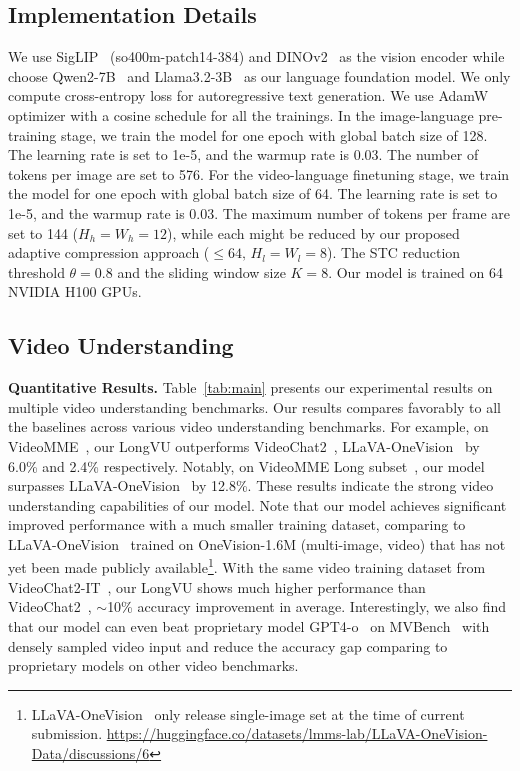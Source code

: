 \subsection{Implementation Details}

We use SigLIP~\citep{zhai2023sigmoid} (so400m-patch14-384) and DINOv2~\citep{oquab2023dinov2} as the vision encoder while choose Qwen2-7B~\citep{qwen2} and Llama3.2-3B~\citep{llama32} as our language foundation model. We only compute cross-entropy loss for autoregressive text generation. We use AdamW~\citep{loshchilov2017decoupled} optimizer with a cosine schedule for all the trainings. In the image-language pre-training stage, we train the model for one epoch with global batch size of 128. The learning rate is set to 1e-5, and the warmup rate is 0.03. The number of tokens per image are set to 576. For the video-language finetuning stage, we train the model for one epoch with global batch size of 64. The learning rate is set to 1e-5, and the warmup rate is 0.03. The maximum number of tokens per frame are set to 144 ($H_h=W_h=12$), while each might be reduced by our proposed adaptive compression approach ($\leq 64, \, H_l=W_l=8$). The STC reduction threshold $\theta=0.8$ and the sliding window size $K = 8$. Our model is trained on 64 NVIDIA H100 GPUs.

\subsection{Video Understanding}

\noindent\textbf{Quantitative Results.} Table~\ref{tab:main} presents our experimental results on multiple video understanding benchmarks. Our results compares favorably to all the baselines across various video understanding benchmarks. For example, on VideoMME~\citep{fu2024video}, our LongVU outperforms VideoChat2~\citep{li2024mvbench}, LLaVA-OneVision~\citep{li2024llava} by 6.0\% and 2.4\% respectively. Notably, on VideoMME Long subset~\citep{fu2024video}, our model surpasses LLaVA-OneVision~\citep{li2024llava} by 12.8\%. These results indicate the strong video understanding capabilities of our model. Note that our model achieves significant improved performance with a much smaller training dataset, comparing to LLaVA-OneVision~\citep{li2024llava} trained on OneVision-1.6M (multi-image, video) that has not yet been made publicly available\footnote{LLaVA-OneVision~\citep{li2024llava} only release single-image set at the time of current submission. \href{https://huggingface.co/datasets/lmms-lab/LLaVA-OneVision-Data/discussions/6}{https://huggingface.co/datasets/lmms-lab/LLaVA-OneVision-Data/discussions/6}}. With the same video training dataset from VideoChat2-IT~\citep{li2024mvbench}, our LongVU shows much higher performance than VideoChat2~\citep{li2024mvbench}, $\sim$10\% accuracy improvement in average. 
Interestingly, we also find that our model can even beat proprietary model GPT4-o~\citep{openai2024gpt4o} on MVBench~\citep{li2024mvbench} with densely sampled video input and reduce the accuracy gap comparing to proprietary models on other video benchmarks. 

